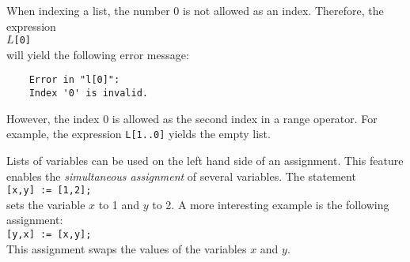 When indexing a list, the number $0$ is not allowed as an index.  Therefore, the expression
\\[0.2cm]
\hspace*{1.3cm}
\texttt{$L$[0]}
\\[0.2cm]
will yield the following error message:
\begin{verbatim}
    Error in "l[0]":
    Index '0' is invalid.
\end{verbatim}
However, the index $0$ is allowed as the second index in a range operator.  For example, the expression
\texttt{L[1..0]}
yields the empty list.


Lists of variables can be used on the left hand side of an assignment.  This feature enables the
\emph{simultaneous assignment} of several variables.  The statement
\\[0.2cm]
\hspace*{1.3cm}
\texttt{[x,y] := [1,2];}
\\[0.2cm]
sets the variable $x$ to 1 and $y$ to 2.  A more interesting example is the following assignment:
\\[0.2cm]
\hspace*{1.3cm}
\texttt{[y,x] := [x,y];}
\\[0.2cm]
This assignment swaps the values of the variables $x$ and $y$.

